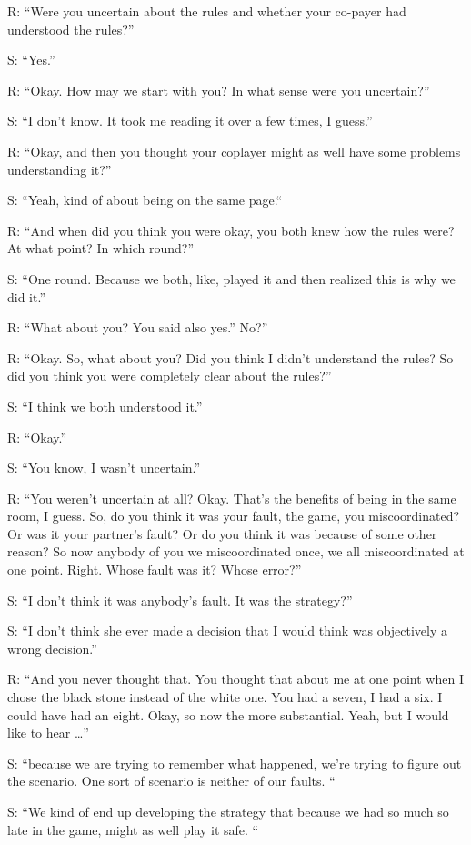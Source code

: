 R: “Were you uncertain about the rules and whether your co-payer had understood the rules?” 

S: “Yes.”

R: “Okay. How may we start with you? In what sense were you uncertain?” 

S: “I don't know. It took me reading it over a few times, I guess.” 

R: “Okay, and then you thought your coplayer might as well have some problems understanding it?”

S: “Yeah, kind of about being on the same page.“

R: “And when did you think you were okay, you both knew how the rules were? At what point? In which round?”

S: “One round. Because we both, like, played it and then realized this is why we did it.” 

R: “What about you? You said also yes.” No?”

R: “Okay. So, what about you? Did you think I didn't understand the rules? So did you think you were completely clear about the rules?” 

S: “I think we both understood it.” 

R: “Okay.” 

S: “You know, I wasn't uncertain.”

R: “You weren’t uncertain at all? Okay. That's the benefits of being in the same room, I guess. So, do you think it was your fault, the game, you miscoordinated? Or was it your partner's fault? Or do you think it was because of some other reason? So now anybody of you we miscoordinated once, we all miscoordinated at one point. Right. Whose fault was it? Whose error?”

S: “I don’t think it was anybody’s fault. It was the strategy?” 

S: “I don't think she ever made a decision that I would think was objectively a wrong decision.” 

R: “And you never thought that. You thought that about me at one point when I chose the black stone instead of the white one. You had a seven, I had a six. I could have had an eight. Okay, so now the more substantial. Yeah, but I would like to hear …”

S: “because we are trying to remember what happened, we're trying to figure out the scenario. One sort of scenario is neither of our faults. “

S: “We kind of end up developing the strategy that because we had so much so late in the game, might as well play it safe. “

